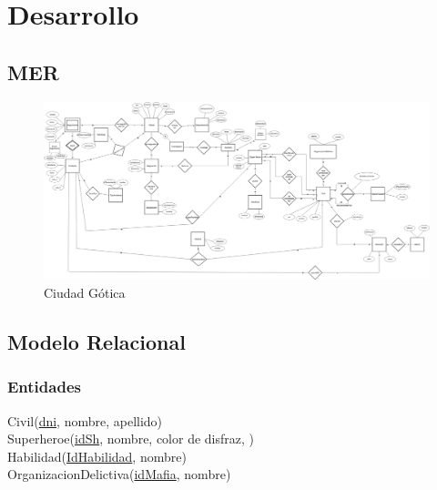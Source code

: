 \section{Desarrollo}

\subsection{MER} 

\begin{figure}[ht]
  \centering
  \includegraphics[scale=0.20]{MER/CiudadGotica.jpg}
  \caption{Ciudad Gótica}
  \label{fig:cg}
\end{figure}

\newpage
\subsection{Modelo Relacional}\label{modelo-relacional}

\subsubsection{Entidades}\label{entidades}

Civil(\uline{dni}, nombre, apellido)\\

Superheroe(\uline{idSh}, nombre, color de disfraz, )\\

Habilidad(\uline{IdHabilidad}, nombre)\\

OrganizacionDelictiva(\uline{idMafia}, nombre)\\

